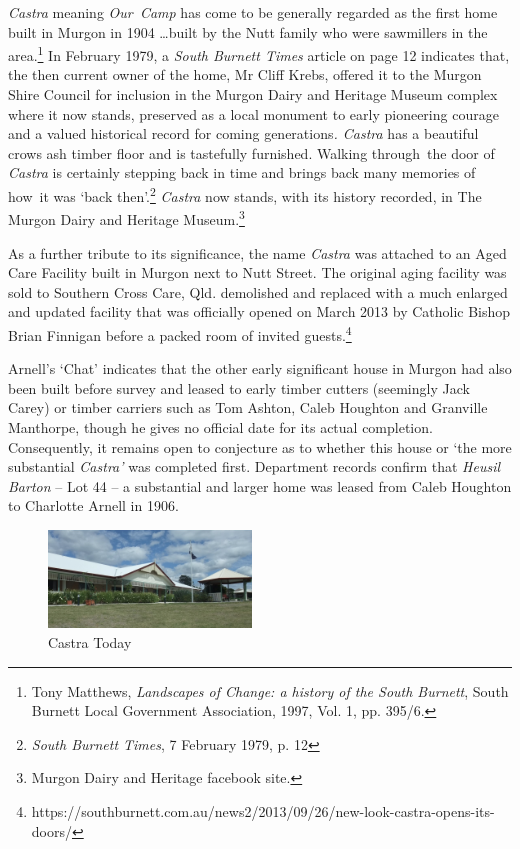 \emph{Castra} meaning \emph{Our~Camp} has come to be generally regarded
as the first home built in Murgon in 1904 \ldots built by the Nutt
family who were sawmillers in the area.\footnote{Tony Matthews,
  \emph{Landscapes of Change: a history of the South Burnett}, South
  Burnett Local Government Association, 1997, Vol. 1, pp. 395/6.} In
February 1979, a \emph{South Burnett Times} article on page 12 indicates
that, the then current owner of the home, Mr Cliff Krebs, offered it to
the Murgon Shire Council for inclusion in the Murgon Dairy and Heritage
Museum complex where it now stands, preserved as a local monument to
early pioneering courage and a valued historical record for coming
generations\emph{. Castra} has a beautiful crows ash timber floor and is
tastefully furnished. Walking through~the door of \emph{Castra} is
certainly stepping back in time and brings back many memories of how~it
was `back then'.\footnote{\emph{South Burnett Times}, 7 February 1979,
  p. 12} \emph{Castra} now stands, with its history recorded, in The
Murgon Dairy and Heritage Museum.\footnote{Murgon Dairy and Heritage
  facebook site.}

As a further tribute to its significance, the name \emph{Castra} was
attached to an Aged Care Facility built in Murgon next to Nutt Street.
The original aging facility was sold to Southern Cross Care, Qld.
demolished and replaced with a much enlarged and updated facility that
was officially opened on March 2013 by Catholic Bishop Brian Finnigan
before a packed room of invited guests.\footnote{https://southburnett.com.au/news2/2013/09/26/new-look-castra-opens-its-doors/}

Arnell's `Chat' indicates that the other early significant house in
Murgon had also been built before survey and leased to early timber
cutters (seemingly Jack Carey) or timber carriers such as Tom Ashton,
Caleb Houghton and Granville Manthorpe, though he gives no official date
for its actual completion. Consequently, it remains open to conjecture
as to whether this house or `the more substantial \emph{Castra'} was
completed first. Department records confirm that \emph{Heusil Barton} --
Lot 44 -- a substantial and larger home was leased from Caleb Houghton
to Charlotte Arnell in 1906.




\begin{figure}
\begin{center}
\includegraphics[width=0.48\textwidth,right]{images/castraToday.png}
\caption{Castra Today}
\end{center}
\end{figure}


